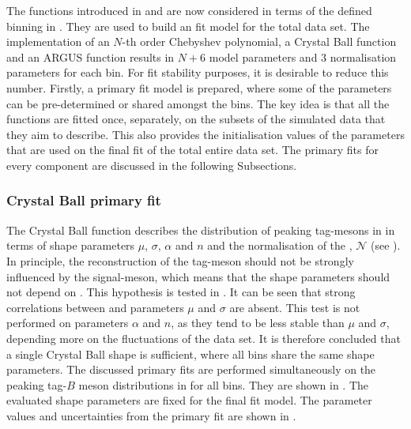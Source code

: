 The functions introduced in  and  are now considered in terms of the defined binning in .
They are used to build an \Mbc fit model for the total data set.
The implementation of an $N$-th order Chebyshev polynomial, a Crystal Ball function and an ARGUS function results
in $N+6$ model parameters and 3 normalisation parameters for each \EB bin.
For fit stability purposes, it is desirable to reduce this number.
Firstly, a primary fit model is prepared, where some of the parameters can be pre-determined or shared amongst the bins.
The key idea is that all the functions are fitted once, separately, on the subsets of the simulated data that they aim to describe.
This also provides the initialisation values of the parameters that are used on the final fit of the total entire data set.
The primary fits for every component are discussed in the following Subsections.

\subsubsection{Crystal Ball primary fit}\label{sec:crystal_ball_prefit}

The Crystal Ball function describes the distribution of peaking tag-\B mesons in \Mbc in terms of shape parameters $\mu$, $\sigma$, $\alpha$ and $n$ and the normalisation of the \PDF, $\mathcal{N}$ (see ).
In principle, the reconstruction of the tag-\B meson should not be strongly influenced by the signal-\B meson, which means that the shape parameters should not depend on \EB.
This hypothesis is tested in .
It can be seen that strong correlations between \EB and parameters $\mu$ and $\sigma$ are absent.
This test is not performed on parameters $\alpha$ and $n$, as they tend to be less stable than $\mu$ and $\sigma$, depending more on the fluctuations of the data set.
It is therefore concluded that a single Crystal Ball shape is sufficient, where all \EB bins share the same shape parameters.
The discussed primary fits are performed simultaneously on the peaking tag-$B$ meson \Mbc distributions in \MC for all \EB bins.
They are shown in .
The evaluated shape parameters are fixed for the final \Mbc fit model.
The parameter values and uncertainties from the primary fit are shown in .

